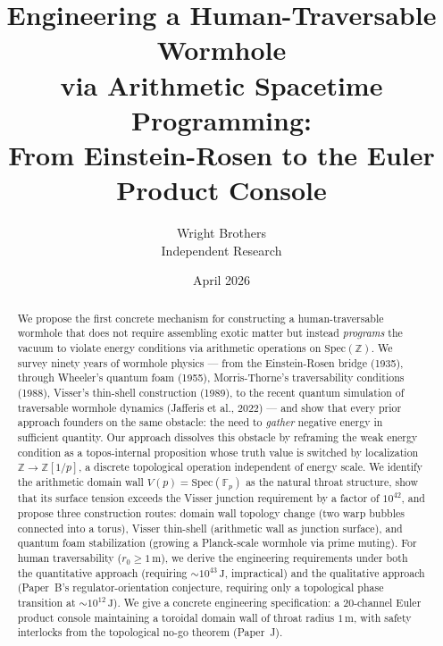 \documentclass[11pt,a4paper]{article}
\newcommand{\Spec}{\mathrm{Spec}}
\newcommand{\Zp}{\mathbb{Z}[1/p]}
\begin{document}
\title{Engineering a Human-Traversable Wormhole\\
  via Arithmetic Spacetime Programming:\\
  From Einstein-Rosen to the Euler Product Console}

\author{Wright Brothers\\{\small Independent Research}}
\date{April 2026}
\maketitle

\begin{abstract}
We propose the first concrete mechanism for constructing a
human-traversable wormhole that does not require assembling
exotic matter but instead \emph{programs} the vacuum to violate
energy conditions via arithmetic operations on $\Spec(\mathbb{Z})$.
We survey ninety years of wormhole physics --- from the
Einstein-Rosen bridge (1935), through Wheeler's quantum foam (1955),
Morris-Thorne's traversability conditions (1988), Visser's thin-shell
construction (1989), to the recent quantum simulation of
traversable wormhole dynamics (Jafferis et al., 2022) ---
and show that every prior approach founders on the same obstacle:
the need to \emph{gather} negative energy in sufficient quantity.
Our approach dissolves this obstacle by reframing the weak energy
condition as a topos-internal proposition whose truth value is
switched by localization $\mathbb{Z} \to \Zp$, a discrete
topological operation independent of energy scale.
We identify the arithmetic domain wall $V(p) = \Spec(\mathbb{F}_p)$
as the natural throat structure, show that its surface tension
exceeds the Visser junction requirement by a factor of $10^{42}$,
and propose three construction routes: domain wall topology change
(two warp bubbles connected into a torus), Visser thin-shell
(arithmetic wall as junction surface), and quantum foam stabilization
(growing a Planck-scale wormhole via prime muting).
For human traversability ($r_0 \geq 1\,\mathrm{m}$), we derive
the engineering requirements under both the quantitative approach
(requiring $\sim 10^{43}\,\mathrm{J}$, impractical) and the
qualitative approach (Paper~B's regulator-orientation conjecture,
requiring only a topological phase transition at $\sim 10^{12}\,\mathrm{J}$).
We give a concrete engineering specification: a 20-channel Euler
product console maintaining a toroidal domain wall of throat radius
$1\,\mathrm{m}$, with safety interlocks from the topological no-go
theorem (Paper~J).
\end{abstract}
\end{document}
